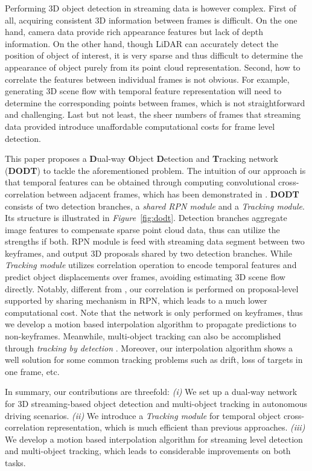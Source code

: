 \documentclass[letterpaper, 10 pt, conference]{ieeeconf}  %
\def\figurename{\emph{Figure}}
\begin{document}
Performing 3D object detection in streaming data is however complex. First of all, acquiring consistent 3D information between frames is difficult. On the one hand, camera data provide rich appearance features but lack of depth information. On the other hand, though LiDAR can accurately detect the position of object of interest, it is very sparse and thus difficult to determine the appearance of object purely from its point cloud representation. Second, how to correlate the features between individual frames is not obvious. For example, generating 3D scene flow with temporal feature representation will need to determine the corresponding points between frames, which is not straightforward and challenging. Last but not least, the sheer numbers of frames that streaming data provided introduce unaffordable computational costs for frame level detection. 

This paper proposes a \textbf{D}ual-way \textbf{O}bject \textbf{D}etection and \textbf{T}racking network (\textbf{DODT}) to tackle the aforementioned problem. The intuition of our approach is that temporal features can be obtained through computing convolutional cross-correlation between adjacent frames, which has been demonstrated in \cite{feichtenhofer2017detect}. \textbf{DODT} consists of two detection branches, a \textit{shared RPN module} and a \textit{Tracking module}. Its structure is illustrated in \figurename \, \ref{fig:dodt}. Detection branches aggregate image features to compensate sparse point cloud data, thus can utilize the strengths if both. RPN module is feed with streaming data segment between two keyframes, and output 3D proposals shared by two detection branches. While \textit{Tracking module} utilizes correlation operation to encode temporal features and predict object displacements over frames, avoiding estimating 3D scene flow directly. Notably, different from \cite{feichtenhofer2017detect, dosovitskiy2015flownet}, our correlation is performed on proposal-level supported by sharing mechanism in RPN, which leads to a much lower computational cost. Note that the network is only performed on keyframes, thus we develop a motion based interpolation algorithm to propagate predictions to non-keyframes. Meanwhile, multi-object tracking can also be accomplished through \textit{tracking by detection} \cite{lenz2015followme}. Moreover, our interpolation algorithm shows a well solution for some common tracking problems such as drift, loss of targets in one frame, etc.

In summary, our contributions are threefold: \textit{(i)} We set up a dual-way network for 3D streaming-based object detection and multi-object tracking in autonomous driving scenarios. \textit{(ii)} We introduce a \textit{Tracking module} for temporal object cross-correlation representation, which is much efficient than previous approaches. \textit{(iii)} We develop a motion based interpolation algorithm for streaming level detection and multi-object tracking, which leads to considerable improvements on both tasks. 
\end{document}
